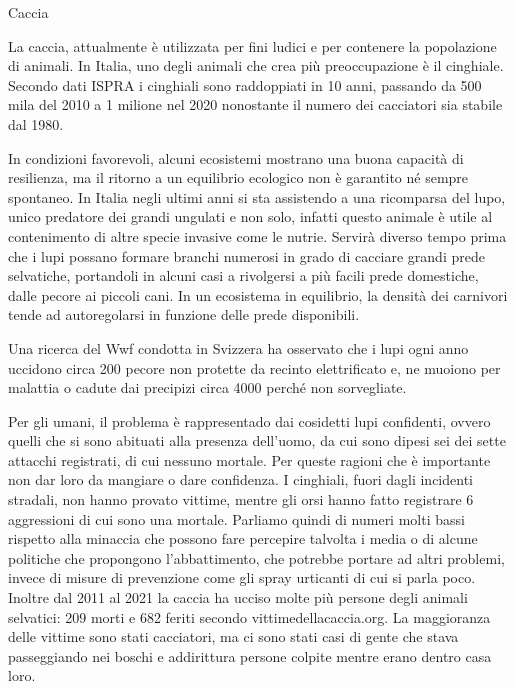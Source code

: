 \documentclass[12pt]{book} %
\begin{document}
\begin{mdframed}[linewidth=1pt]
Caccia

La caccia, attualmente è utilizzata per fini ludici e per contenere la popolazione di animali. In Italia, uno degli animali che crea più preoccupazione è il cinghiale. Secondo dati ISPRA i cinghiali sono raddoppiati in 10 anni, passando da 500 mila del 2010 a 1 milione nel 2020 nonostante il numero dei cacciatori sia stabile dal
1980. 

In condizioni favorevoli, alcuni ecosistemi mostrano una buona capacità di resilienza, ma il ritorno a un equilibrio ecologico non è garantito né sempre spontaneo. In Italia negli ultimi anni si sta assistendo a una ricomparsa del lupo, unico predatore dei grandi ungulati e non solo, infatti questo animale è utile al contenimento di altre specie invasive come le nutrie. 
Servirà diverso tempo prima che i lupi possano formare branchi numerosi in grado di cacciare grandi prede selvatiche, portandoli in alcuni casi a rivolgersi a più facili prede domestiche, dalle pecore ai piccoli cani. In un ecosistema in equilibrio, la densità dei carnivori tende ad autoregolarsi in funzione delle prede disponibili.

Una ricerca del Wwf condotta in Svizzera ha osservato che i lupi ogni anno uccidono circa 200 pecore non protette da recinto elettrificato e, ne muoiono per malattia o cadute dai precipizi circa 4000 perché non sorvegliate. 

Per gli umani, il problema è rappresentado dai cosidetti lupi confidenti, ovvero quelli che si sono abituati alla presenza dell'uomo, da cui sono dipesi sei dei sette attacchi registrati, di cui nessuno mortale. Per queste ragioni che è importante non dar loro da mangiare o dare confidenza. 
I cinghiali, fuori dagli incidenti stradali, non hanno provato vittime, mentre gli orsi hanno fatto registrare 6 aggressioni di cui sono una mortale.
Parliamo quindi di numeri molti bassi rispetto alla minaccia che possono fare percepire talvolta i media o di alcune politiche che propongono l'abbattimento, che potrebbe portare ad altri problemi, invece di misure di prevenzione come gli spray urticanti di cui si parla poco. Inoltre dal 2011 al 2021 la caccia ha ucciso  molte più persone degli animali selvatici: 209 morti e 682 feriti secondo vittimedellacaccia.org. La maggioranza delle vittime sono stati cacciatori, ma ci sono stati casi di gente che stava passeggiando nei boschi e addirittura persone colpite mentre erano dentro casa loro. 


\end{mdframed}
\end{document}
